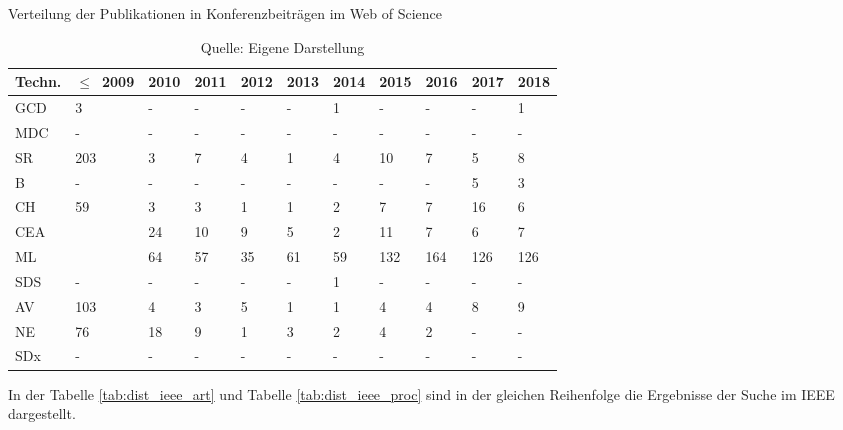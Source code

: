 \begin{table}
	\caption{Verteilung der Publikationen in Konferenzbeiträgen im \glqq Web of Science\grqq}
	\selectfont
	\footnotesize
	\centering
	\label{tab:dist_wos_proc}
\begin{tabularx}{\linewidth}{XXXXXXXXXXX}
	\hline
	Techn. & $\leq$~2009 & 2010 & 2011 & 2012 & 2013 & 2014 & 2015 & 2016 & 2017 & 2018 \\
	\hline
	\acs{GCD} & 3 & - & - & - & - & 1 & - & - & - & 1 \\
	\acs{MDC} & - & - & - & - & - & - & - & - & - & - \\
	\acs{SR} & 203 & 3 & 7 & 4 & 1 & 4 & 10 & 7 & 5 & 8 \\
	\acs{B} & - & - & - & - & - & - & - & - & 5 & 3 \\
	\acs{CH} & 59 & 3 & 3 & 1 & 1 & 2 & 7 & 7 & 16 & 6 \\
	\acs{CEA} & \numprint{1621} & 24 & 10 & 9 & 5 & 2 & 11 & 7 & 6 & 7 \\
	\acs{ML} & \numprint{2042} & 64 & 57 & 35 & 61 & 59 & 132 & 164 & 126 & 126 \\
	\acs{SDS} & - & - & - & - & - & 1 & - & - & - & - \\
	\acs{AV} & 103 & 4 & 3 & 5 & 1 & 1 & 4 & 4 & 8 & 9 \\
	\acs{NE} & 76 & 18 & 9 & 1 & 3 & 2 & 4 & 2 & - & - \\
	\acs{SDx} & - & - & - & - & - & - & - & - & - & - \\
	\hline
\end{tabularx}
\caption*{Quelle: Eigene Darstellung}
\end{table}

In der Tabelle \ref{tab:dist_ieee_art} und Tabelle \ref{tab:dist_ieee_proc} sind in der gleichen Reihenfolge die Ergebnisse der Suche im \ac{IEEE} dargestellt.


